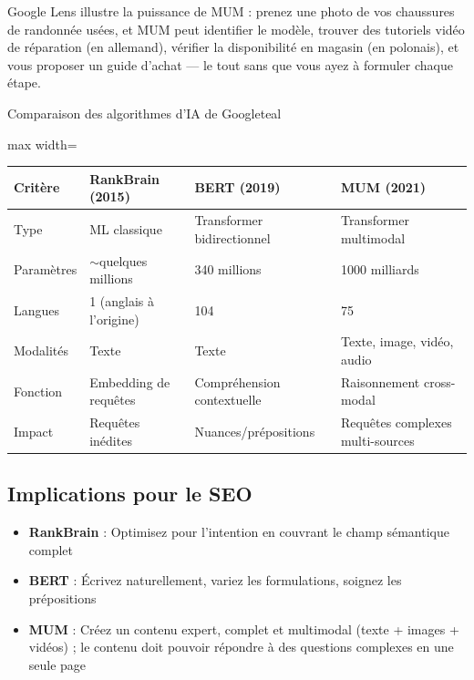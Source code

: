 \documentclass[12pt,a4paper,twoside]{report}
\begin{document}
Google Lens illustre la puissance de MUM : prenez une photo de vos chaussures de randonnée usées, et MUM peut identifier le modèle, trouver des tutoriels vidéo de réparation (en allemand), vérifier la disponibilité en magasin (en polonais), et vous proposer un guide d'achat — le tout sans que vous ayez à formuler chaque étape.

\begin{mybox}{Comparaison des algorithmes d'IA de Google}{teal}
\begin{adjustbox}{max width=\textwidth}
\begin{tabular}{|p{4cm}|p{3.5cm}|p{3.5cm}|p{3.5cm}|}
\hline
\textbf{Critère} & \textbf{RankBrain (2015)} & \textbf{BERT (2019)} & \textbf{MUM (2021)} \\
\hline
Type & ML classique & Transformer bidirectionnel & Transformer multimodal \\
\hline
Paramètres & $\sim$quelques millions & 340 millions & 1000 milliards \\
\hline
Langues & 1 (anglais à l'origine) & 104 & 75 \\
\hline
Modalités & Texte & Texte & Texte, image, vidéo, audio \\
\hline
Fonction & Embedding de requêtes & Compréhension contextuelle & Raisonnement cross-modal \\
\hline
Impact & Requêtes inédites & Nuances/prépositions & Requêtes complexes multi-sources \\
\hline
\end{tabular}
\end{adjustbox}
\end{mybox}

\subsection{Implications pour le SEO}

\begin{itemize}
    \item \textbf{RankBrain} : Optimisez pour l'intention en couvrant le champ sémantique complet
    \item \textbf{BERT} : Écrivez naturellement, variez les formulations, soignez les prépositions
    \item \textbf{MUM} : Créez un contenu expert, complet et multimodal (texte + images + vidéos) ; le contenu doit pouvoir répondre à des questions complexes en une seule page
\end{itemize}
\end{document}
